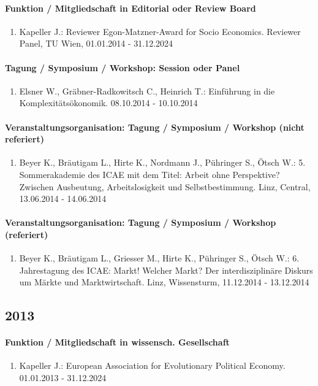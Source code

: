 \paragraph{Funktion / Mitgliedschaft in Editorial oder Review Board} 
\begin{enumerate}[leftmargin=*, labelsep=0.5cm] 
 	 \item Kapeller J.: Reviewer Egon-Matzner-Award for Socio Economics. Reviewer Panel, TU Wien, 01.01.2014 - 31.12.2024 
\end{enumerate} 
\paragraph{Tagung / Symposium / Workshop: Session oder Panel} 
\begin{enumerate}[leftmargin=*, labelsep=0.5cm] 
 	 \item Elsner W., Gräbner-Radkowitsch C., Heinrich T.: Einführung in die Komplexitätsökonomik. 08.10.2014 - 10.10.2014 
\end{enumerate} 
\paragraph{Veranstaltungsorganisation: Tagung / Symposium / Workshop (nicht referiert)} 
\begin{enumerate}[leftmargin=*, labelsep=0.5cm] 
 	 \item Beyer K., Bräutigam L., Hirte K., Nordmann J., Pühringer S., Ötsch W.: 5. Sommerakademie des ICAE mit dem Titel: Arbeit ohne Perspektive? Zwischen Ausbeutung, Arbeitslosigkeit und Selbstbestimmung. Linz, Central, 13.06.2014 - 14.06.2014 
\end{enumerate} 
\paragraph{Veranstaltungsorganisation: Tagung / Symposium / Workshop (referiert)} 
\begin{enumerate}[leftmargin=*, labelsep=0.5cm] 
 	 \item Beyer K., Bräutigam L., Griesser M., Hirte K., Pühringer S., Ötsch W.: 6. Jahrestagung des ICAE: Markt! Welcher Markt? Der interdisziplinäre Diskurs um Märkte und Marktwirtschaft. Linz, Wissensturm, 11.12.2014 - 13.12.2014 
\end{enumerate} 
\subsection*{2013} 
\paragraph{Funktion / Mitgliedschaft in wissensch. Gesellschaft} 
\begin{enumerate}[leftmargin=*, labelsep=0.5cm] 
 	 \item Kapeller J.: European Association for Evolutionary Political Economy. 01.01.2013 - 31.12.2024 
\end{enumerate} 
